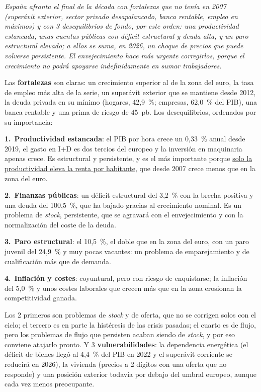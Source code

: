 \begin{examen}
\textit{España afronta el final de la década con fortalezas que no tenía en 2007 (superávit exterior, sector privado desapalancado, banca rentable, empleo en máximos) y con 3 desequilibrios de fondo, por este orden: una productividad estancada, unas cuentas públicas con déficit estructural y deuda alta, y un paro estructural elevado; a ellos se suma, en 2026, un choque de precios que puede volverse persistente. El envejecimiento hace más urgente corregirlos, porque el crecimiento no podrá apoyarse indefinidamente en sumar trabajadores.}

Las \textbf{fortalezas} son claras: un crecimiento superior al de la zona del euro, la tasa de empleo más alta de la serie, un superávit exterior que se mantiene desde 2012, la deuda privada en su mínimo (hogares, 42,9~\%; empresas, 62,0~\% del PIB), una banca rentable y una prima de riesgo de 45~pb. Los desequilibrios, ordenados por su importancia:

\textbf{1.}~\textbf{Productividad estancada}: el PIB por hora crece un 0,33~\% anual desde 2019, el gasto en I+D es dos tercios del europeo y la inversión en maquinaria apenas crece. Es estructural y persistente, y es el más importante porque \uline{solo la productividad eleva la renta por habitante}, que desde 2007 crece menos que en la zona del euro.


\textbf{2.}~\textbf{Finanzas públicas}: un déficit estructural del 3,2~\% con la brecha positiva y una deuda del 100,5~\%, que ha bajado gracias al crecimiento nominal. Es un problema de \emph{stock}, persistente, que se agravará con el envejecimiento y con la normalización del coste de la deuda.


\textbf{3.}~\textbf{Paro estructural}: el 10,5~\%, el doble que en la zona del euro, con un paro juvenil del 24,9~\% y muy pocas vacantes: un problema de emparejamiento y de cualificación más que de demanda.


\textbf{4.}~\textbf{Inflación y costes}: coyuntural, pero con riesgo de enquistarse; la inflación del 5,0~\% y unos costes laborales que crecen más que en la zona erosionan la competitividad ganada.

Los 2 primeros son problemas de \emph{stock} y de oferta, que no se corrigen solos con el ciclo; el tercero es en parte la histéresis de las crisis pasadas; el cuarto es de flujo, pero los problemas de flujo que persisten acaban siendo de \emph{stock}, y por eso conviene atajarlo pronto. Y 3 \textbf{vulnerabilidades}: la dependencia energética (el déficit de bienes llegó al 4,4~\% del PIB en 2022 y el superávit corriente se reducirá en 2026), la vivienda (precios a 2 dígitos con una oferta que no responde) y una posición exterior todavía por debajo del umbral europeo, aunque cada vez menos preocupante.


\end{examen}
